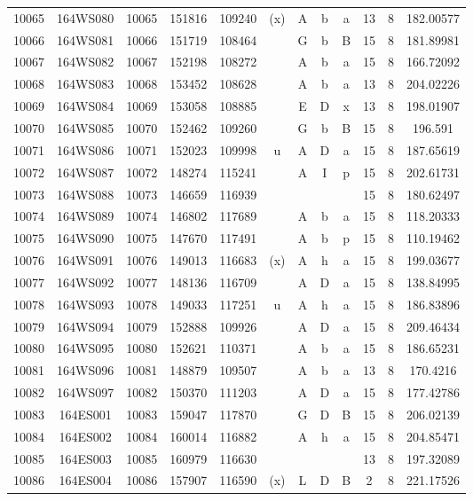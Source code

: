 \begin{tabular}{|*{12}{c|}}
10065 & 164WS080 & 10065 & 151816 & 109240 & (x) & A & b & a & 13 & 8 & 182.00577 \\ 
10066 & 164WS081 & 10066 & 151719 & 108464 &  & G & b & B & 15 & 8 & 181.89981 \\ 
10067 & 164WS082 & 10067 & 152198 & 108272 &  & A & b & a & 15 & 8 & 166.72092 \\ 
10068 & 164WS083 & 10068 & 153452 & 108628 &  & A & b & a & 13 & 8 & 204.02226 \\ 
10069 & 164WS084 & 10069 & 153058 & 108885 &  & E & D & x & 13 & 8 & 198.01907 \\ 
10070 & 164WS085 & 10070 & 152462 & 109260 &  & G & b & B & 15 & 8 & 196.591 \\ 
10071 & 164WS086 & 10071 & 152023 & 109998 & u & A & D & a & 15 & 8 & 187.65619 \\ 
10072 & 164WS087 & 10072 & 148274 & 115241 &  & A & I & p & 15 & 8 & 202.61731 \\ 
10073 & 164WS088 & 10073 & 146659 & 116939 &  &  &  &  & 15 & 8 & 180.62497 \\ 
10074 & 164WS089 & 10074 & 146802 & 117689 &  & A & b & a & 15 & 8 & 118.20333 \\ 
10075 & 164WS090 & 10075 & 147670 & 117491 &  & A & b & p & 15 & 8 & 110.19462 \\ 
10076 & 164WS091 & 10076 & 149013 & 116683 & (x) & A & h & a & 15 & 8 & 199.03677 \\ 
10077 & 164WS092 & 10077 & 148136 & 116709 &  & A & D & a & 15 & 8 & 138.84995 \\ 
10078 & 164WS093 & 10078 & 149033 & 117251 & u & A & h & a & 15 & 8 & 186.83896 \\ 
10079 & 164WS094 & 10079 & 152888 & 109926 &  & A & D & a & 15 & 8 & 209.46434 \\ 
10080 & 164WS095 & 10080 & 152621 & 110371 &  & A & b & a & 15 & 8 & 186.65231 \\ 
10081 & 164WS096 & 10081 & 148879 & 109507 &  & A & b & a & 13 & 8 & 170.4216 \\ 
10082 & 164WS097 & 10082 & 150370 & 111203 &  & A & D & a & 15 & 8 & 177.42786 \\ 
10083 & 164ES001 & 10083 & 159047 & 117870 &  & G & D & B & 15 & 8 & 206.02139 \\ 
10084 & 164ES002 & 10084 & 160014 & 116882 &  & A & h & a & 15 & 8 & 204.85471 \\ 
10085 & 164ES003 & 10085 & 160979 & 116630 &  &  &  &  & 13 & 8 & 197.32089 \\ 
10086 & 164ES004 & 10086 & 157907 & 116590 & (x) & L & D & B & 2 & 8 & 221.17526 \\ 

\end{tabular}
